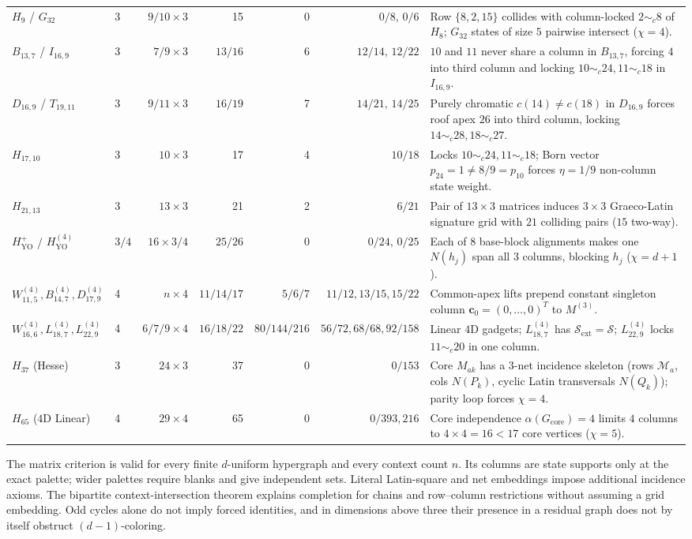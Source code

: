 \documentclass[aps,pra,reprint,superscriptaddress,longbibliography,nofootinbib,floatfix,10pt]{revtex4-2}
\theoremstyle{definition}\newtheorem{definition}[theorem]{Definition}
\theoremstyle{remark}\newtheorem{remark}[theorem]{Remark}
\newcommand{\Sc}{\mathcal S}\newcommand{\Cc}{\mathcal C}
\newcommand{\YO}{\mathrm{YO}}\newcommand{\ip}[2]{\langle #1,#2\rangle}
\begin{document}
\begin{table}[t]
\begin{tabular}{llrrrrp{}}
$H_9$ / $G_{32}$ & 3 & $9/10\times 3$ & 15 & 0 & $0/8,\,0/6$ & Row $\{8,2,15\}$ collides with column-locked $2\sim_c 8$ of $H_8$; $G_{32}$ states of size $5$ pairwise intersect ($\chi=4$).\\
$B_{13,7}$ / $I_{16,9}$ & 3 & $7/9\times 3$ & $13/16$ & 6 & $12/14,\,12/22$ & $10$ and $11$ never share a column in $B_{13,7}$, forcing $4$ into third column and locking $10\sim_c 24,11\sim_c 18$ in $I_{16,9}$.\\
$D_{16,9}$ / $T_{19,11}$ & 3 & $9/11\times 3$ & $16/19$ & 7 & $14/21,\,14/25$ & Purely chromatic $c(14)\neq c(18)$ in $D_{16,9}$ forces roof apex $26$ into third column, locking $14\sim_c 28,18\sim_c 27$.\\
$H_{17,10}$ & 3 & $10\times 3$ & 17 & 4 & $10/18$ & Locks $10\sim_c 24,11\sim_c 18$; Born vector $p_{24}=1\neq 8/9=p_{10}$ forces $\eta=1/9$ non-column state weight.\\
$H_{21,13}$ & 3 & $13\times 3$ & 21 & 2 & $6/21$ & Pair of $13\times 3$ matrices induces $3\times 3$ Graeco-Latin signature grid with $21$ colliding pairs ($15$ two-way).\\
$H_{\YO}^+$ / $H_{\YO}^{(4)}$ & $3/4$ & $16\times 3/4$ & $25/26$ & 0 & $0/24,\,0/25$ & Each of $8$ base-block alignments makes one $N(h_j)$ span all $3$ columns, blocking $h_j$ ($\chi=d+1$).\\
$W_{11,5}^{(4)},B_{14,7}^{(4)},D_{17,9}^{(4)}$ & 4 & $n\times 4$ & $11/14/17$ & $5/6/7$ & $11/12,13/15,15/22$ & Common-apex lifts prepend constant singleton column $\mathbf{c}_0=(0,\ldots,0)^T$ to $M^{(3)}$.\\
$W_{16,6}^{(4)},L_{18,7}^{(4)},L_{22,9}^{(4)}$ & 4 & $6/7/9\times 4$ & $16/18/22$ & $80/144/216$ & $56/72,68/68,92/158$ & Linear $4$D gadgets; $L_{18,7}^{(4)}$ has $\Sc_{\mathrm{ext}}=\Sc$; $L_{22,9}^{(4)}$ locks $11\sim_c 20$ in one column.\\
$H_{37}$ (Hesse) & 3 & $24\times 3$ & 37 & 0 & $0/153$ & Core $M_{ak}$ has a $3$-net incidence skeleton (rows $\mathcal{M}_a$, cols $N(P_k)$, cyclic Latin transversals $N(Q_k)$); parity loop forces $\chi=4$.\\
$H_{65}$ ($4$D Linear) & 4 & $29\times 4$ & 65 & 0 & $0/393{,}216$ & Core independence $\alpha(G_{\mathrm{core}})=4$ limits $4$ columns to $4\times 4=16<17$ core vertices ($\chi=5$).\\
\bottomrule\end{tabular}
\end{table}

The matrix criterion is valid for every finite $d$-uniform hypergraph and every context count $n$. Its columns are state supports only at the exact palette; wider palettes require blanks and give independent sets. Literal Latin-square and net embeddings impose additional incidence axioms. The bipartite context-intersection theorem explains completion for chains and row--column restrictions without assuming a grid embedding. Odd cycles alone do not imply forced identities, and in dimensions above three their presence in a residual graph does not by itself obstruct $(d-1)$-coloring.
\end{document}
